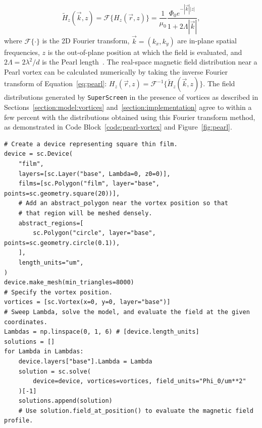 \documentclass[final,3p,times]{elsarticle}
\newcommand{\inline}[1]{\texttt{#1}\xspace}
\newcommand{\SuperScreen}{\inline{SuperScreen}}
\newenvironment{code}{\captionsetup{type=listing}}{\hfill}
\begin{document}
\begin{equation}
    \tilde{H}_z(\vec{k}, z)=\mathcal{F}\{H_z(\vec{r}, z)\}=\frac{1}{\mu_0}\frac{\Phi_0e^{-|\vec{k}||z|}}{1+2\Lambda|\vec{k}|},
    \label{eq:pearl}
\end{equation}
where $\mathcal{F}\{\cdot\}$ is the 2D Fourier transform, $\vec{k}=(k_x, k_y)$ are in-plane spatial frequencies, $z$ is the out-of-plane position at which the field is evaluated, and $2\Lambda = 2\lambda^2 / d$ is the Pearl length~\cite{Pearl1964-cl, Tafuri2004-ap}. The real-space magnetic field distribution near a Pearl vortex can be calculated numerically by taking the inverse Fourier transform of Equation~\ref{eq:pearl}: $H_z(\vec{r}, z)=\mathcal{F}^{-1}\{\tilde{H}_z(\vec{k}, z)\}$. The field distributions generated by \SuperScreen in the presence of vortices as described in Sections~\ref{section:model:vortices} and~\ref{section:implementation} agree to within a few percent with the distributions obtained using this Fourier transform method, as demonstrated in Code Block~\ref{code:pearl-vortex} and Figure~\ref{fig:pearl}.

\begin{code}
\begin{verbatim}
# Create a device representing square thin film.
device = sc.Device(
    "film",
    layers=[sc.Layer("base", Lambda=0, z0=0)],
    films=[sc.Polygon("film", layer="base", points=sc.geometry.square(20))],
    # Add an abstract_polygon near the vortex position so that
    # that region will be meshed densely.
    abstract_regions=[
        sc.Polygon("circle", layer="base", points=sc.geometry.circle(0.1)),
    ],
    length_units="um",
)
device.make_mesh(min_triangles=8000)
# Specify the vortex position.
vortices = [sc.Vortex(x=0, y=0, layer="base")]
# Sweep Lambda, solve the model, and evaluate the field at the given coordinates.
Lambdas = np.linspace(0, 1, 6) # [device.length_units]
solutions = []
for Lambda in Lambdas:
    device.layers["base"].Lambda = Lambda
    solution = sc.solve(
        device=device, vortices=vortices, field_units="Phi_0/um**2"
    )[-1]
    solutions.append(solution)
    # Use solution.field_at_position() to evaluate the magnetic field profile.
\end{verbatim}
\label{code:pearl-vortex}
\end{code}
\end{document}
